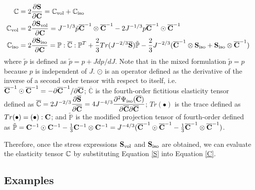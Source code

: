 \begin{subequations} 
\label{C}
\begin{align}
\mathbb{C} &= 2\frac{\partial{\bold{S}}}{\partial{\bold{C}}} = \mathbb{C}_\mathrm{vol} + \mathbb{C}_\mathrm{iso} 
\label{Ctotal} \\
\mathbb{C}_\mathrm{vol} &= 2\frac{\partial{\bold{S}_\mathrm{vol}}}{\partial{\bold{C}}} =
J^{-1/3}\tilde{p}{\overline{\bold{C}}}^{-1}\otimes {\overline{\bold{C}}}^{-1} - 2J^{-1/3}p{\overline{\bold{C}}}^{-1}\odot {\overline{\bold{C}}}^{-1}  \label{Cvol} \\
\mathbb{C}_\mathrm{iso} &= 2\frac{\partial{\bold{S}_\mathrm{iso}}}{\partial{\bold{C}}} =
\mathbb{P} : \overline{\mathbb{C}} : \mathbb{P}^T + \frac{2}{3}Tr(J^{-2/3}\overline{\bold{S}})\tilde{\mathbb{P}} - \frac{2}{3}J^{-2/3}(\overline{\bold{C}}^{-1}\otimes\bold{S}_\mathrm{iso} + \bold{S}_\mathrm{iso}\otimes {\overline{\bold{C}}}^{-1})
\label{Ciso} 
\end{align}
\end{subequations}
where $\tilde{p}$ is defined as $\tilde{p} = p + J{dp}/{dJ}$. Note that in the mixed formulation $\tilde{p} = p$ because $p$ is independent of $J$. $\odot$ is an operator defined as the derivative of the inverse of a second order tensor with respect to itself, i.e. 
${\overline{\bold{C}}}^{-1}\odot {\overline{\bold{C}}}^{-1} = - {\partial{{\overline{\bold{C}}}^{-1}}} / {\partial{{\overline{\bold{C}}}}}$; 
$\overline{\mathbb{C}}$ is the fourth-order fictitious elasticity tensor defined as 
$\overline{\mathbb{C}} = 2J^{-2/3}\dfrac{\partial{\overline{\bold{S}}}}{\partial{\overline{\bold{C}}}} = 4J^{-4/3} \dfrac{\partial^2\Psi_\mathrm{iso}(\overline{\bold{C}})} {\partial{\overline{\bold{C}}}{\partial{\overline{\bold{C}}}}} $;
$Tr(\bullet)$ is the trace defined as $Tr(\bullet) = (\bullet) : \bold{C}$;
and $\tilde{\mathbb{P}}$ is the modified projection tensor of fourth-order defined as 
$\tilde{\mathbb{P}} = \bold{C}^{-1} \odot \bold{C}^{-1} -  \frac{1}{3}\bold{C}^{-1} \otimes \bold{C}^{-1} = J^{-4/3}(
{\overline{\bold{C}}}^{-1} \odot {\overline{\bold{C}}}^{-1} -  \frac{1}{3} {\overline{\bold{C}}}^{-1} \otimes {\overline{\bold{C}}}^{-1})$.

Therefore, once the stress expressions $\bold{S}_\mathrm{vol}$ and $\bold{S}_\mathrm{iso}$ are obtained, we can evaluate the elasticity tensor $\mathbb{C}$ by substituting Equation \ref{S} into Equation \ref{C}.

%
\subsection {Examples}
